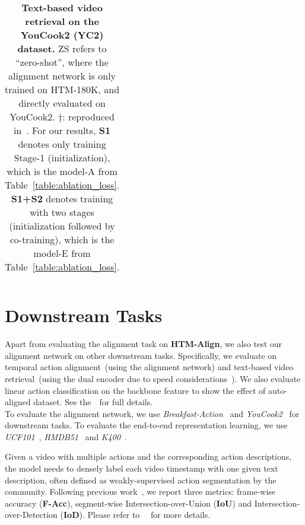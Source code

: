 \begin{table*}[!htb]
\begin{minipage}[t]{0.51\textwidth}
\begin{tabular}[t]{c|c|cccc}
		\hline
	\end{tabular}
	\vspace{-5pt}
\caption{\footnotesize \textbf{Text-based video retrieval on the YouCook2 (YC2) dataset.} 
ZS refers to ``zero-shot'', where the alignment network is only trained on HTM-180K, and directly evaluated on YouCook2. 
$\dagger$: reproduced in~\cite{yc2_leaderboard}.
For our results, \textbf{S1} denotes only training Stage-1 (initialization),
which is the model-A from Table~\ref{table:ablation_loss}.
\textbf{S1+S2} denotes training with two stages (initialization followed by co-training),
which is the model-E from Table~\ref{table:ablation_loss}.
}
\label{table:tv_retrieval}
\end{minipage}
\vspace{-10pt}
\end{table*}

\vspace{-2mm}
\section{Downstream Tasks}\label{sec:downstream}
\vspace{-2mm}
Apart from evaluating the alignment task on \textbf{HTM-Align},
we also test our alignment network on other downstream tasks.
Specifically, we evaluate on temporal action alignment~(using the alignment network)
and text-based video retrieval~(using the dual encoder due to speed considerations~\cite{Miech21}).
We also evaluate linear action classification on the backbone feature to show the effect of auto-aligned dataset. 
See the~\app~for full details.\\[-8pt]

\vspace{-3mm}
To evaluate the alignment network, 
we use \textit{Breakfast-Action}~\cite{Kuehne12} 
and \textit{YouCook2}~\cite{Zhou18} for downstream tasks.
To evaluate the end-to-end representation learning,
we use \textit{UCF101}~\cite{Soomro12}, \textit{HMDB51}~\cite{Kuehne11} and 
\textit{K400}~\cite{Kay17}.
\vspace{-0pt}

\vspace{2mm}
Given a video with multiple actions and the corresponding action descriptions, 
the model needs to densely label each video timestamp with one given text description,
often defined as weakly-supervised action segmentation by the community.
Following previous work~\cite{Ding18,Chang19,Li19cdfl,Chang21},
we report three metrics:
frame-wise accuracy (\textbf{F-Acc}),
segment-wise Intersection-over-Union (\textbf{IoU}) and Intersection-over-Detection (\textbf{IoD}).
Please refer to ~\app~for more details.

